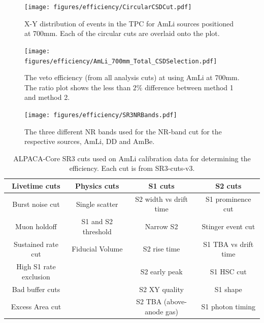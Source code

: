 \begin{figure}
            \centering
            \texttt{[image: figures/efficiency/CircularCSDCut.pdf]}
            \caption{X-Y distribution of events in the TPC for AmLi sources positioned at 700mm. Each of the circular cuts are overlaid onto the plot.}
            \label{fig:CSDSelection}
\end{figure}
\begin{figure}
        \centering
        \texttt{[image: figures/efficiency/AmLi\_700mm\_Total\_CSDSelection.pdf]}
        \caption{The veto efficiency (from all analysis cuts) at using AmLi at 700mm. The ratio plot shows the less than $2\%$ difference between method 1 and method 2.}
        \label{fig:CSDSelectionEffComp}
\end{figure}
\begin{figure}
            \centering
            \texttt{[image: figures/efficiency/SR3NRBands.pdf]}
            \caption{The three different NR bands used for the NR-band cut for the respective sources, AmLi, DD and AmBe.}
            \label{fig:SR3NRBands}
\end{figure}
\begin{table}
    \centering
    \begin{tabular}{c|c|c|c}
     Livetime cuts & Physics cuts & S1 cuts & S2 cuts  \\
     \hline
     Burst noise cut & Single scatter  & S2 width vs drift time & S1 prominence cut \\
     Muon holdoff       & S1 and S2 threshold & Narrow S2 & Stinger event cut \\
     Sustained rate cut & Fiducial Volume & S2 rise time & S1 TBA vs drift time \\
     High S1 rate exclusion & & S2 early peak & S1 HSC cut \\
     Bad buffer cuts & & S2 XY quality & S1 shape \\
     Excess Area cut & & S2 TBA (above-anode gas) & S1 photon timing \\
    \end{tabular}
    \caption{ALPACA-Core SR3 cuts used on AmLi calibration data for determining the efficiency.
    Each cut is from SR3-cuts-v3.
    }
    \label{tab:amli_efficiency_cuts}
\end{table}



